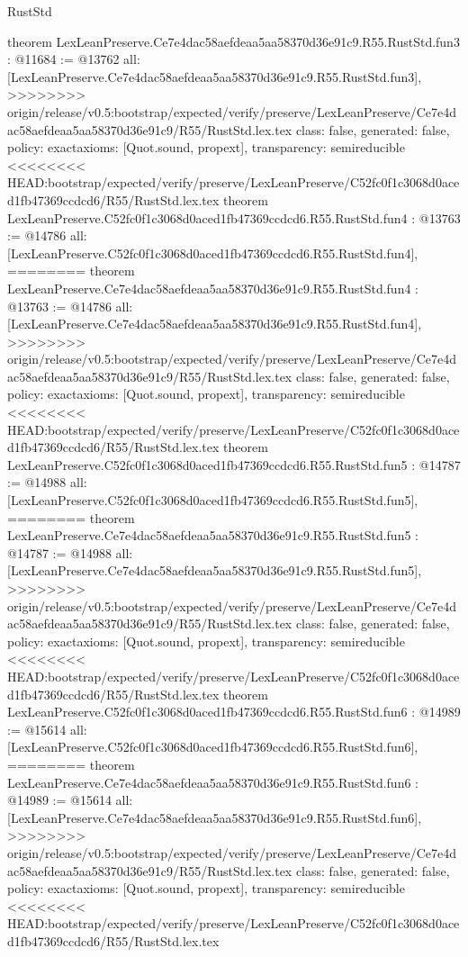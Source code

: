 \begin{lexlean}{RustStd}
\begin{coremodule}
{\begin{coremodule}
{{{{{{theorem LexLeanPreserve.Ce7e4dac58aefdeaa5aa58370d36e91c9.R55.RustStd.fun3 : @11684 := @13762 {
  all: [LexLeanPreserve.Ce7e4dac58aefdeaa5aa58370d36e91c9.R55.RustStd.fun3],
>>>>>>>> origin/release/v0.5:bootstrap/expected/verify/preserve/LexLeanPreserve/Ce7e4dac58aefdeaa5aa58370d36e91c9/R55/RustStd.lex.tex
  class: false,
  generated: false,
  policy: exact{axioms: [Quot.sound, propext]},
  transparency: semireducible
}
<<<<<<<< HEAD:bootstrap/expected/verify/preserve/LexLeanPreserve/C52fc0f1c3068d0aced1fb47369ccdcd6/R55/RustStd.lex.tex
theorem LexLeanPreserve.C52fc0f1c3068d0aced1fb47369ccdcd6.R55.RustStd.fun4 : @13763 := @14786 {
  all: [LexLeanPreserve.C52fc0f1c3068d0aced1fb47369ccdcd6.R55.RustStd.fun4],
========
theorem LexLeanPreserve.Ce7e4dac58aefdeaa5aa58370d36e91c9.R55.RustStd.fun4 : @13763 := @14786 {
  all: [LexLeanPreserve.Ce7e4dac58aefdeaa5aa58370d36e91c9.R55.RustStd.fun4],
>>>>>>>> origin/release/v0.5:bootstrap/expected/verify/preserve/LexLeanPreserve/Ce7e4dac58aefdeaa5aa58370d36e91c9/R55/RustStd.lex.tex
  class: false,
  generated: false,
  policy: exact{axioms: [Quot.sound, propext]},
  transparency: semireducible
}
<<<<<<<< HEAD:bootstrap/expected/verify/preserve/LexLeanPreserve/C52fc0f1c3068d0aced1fb47369ccdcd6/R55/RustStd.lex.tex
theorem LexLeanPreserve.C52fc0f1c3068d0aced1fb47369ccdcd6.R55.RustStd.fun5 : @14787 := @14988 {
  all: [LexLeanPreserve.C52fc0f1c3068d0aced1fb47369ccdcd6.R55.RustStd.fun5],
========
theorem LexLeanPreserve.Ce7e4dac58aefdeaa5aa58370d36e91c9.R55.RustStd.fun5 : @14787 := @14988 {
  all: [LexLeanPreserve.Ce7e4dac58aefdeaa5aa58370d36e91c9.R55.RustStd.fun5],
>>>>>>>> origin/release/v0.5:bootstrap/expected/verify/preserve/LexLeanPreserve/Ce7e4dac58aefdeaa5aa58370d36e91c9/R55/RustStd.lex.tex
  class: false,
  generated: false,
  policy: exact{axioms: [Quot.sound, propext]},
  transparency: semireducible
}
<<<<<<<< HEAD:bootstrap/expected/verify/preserve/LexLeanPreserve/C52fc0f1c3068d0aced1fb47369ccdcd6/R55/RustStd.lex.tex
theorem LexLeanPreserve.C52fc0f1c3068d0aced1fb47369ccdcd6.R55.RustStd.fun6 : @14989 := @15614 {
  all: [LexLeanPreserve.C52fc0f1c3068d0aced1fb47369ccdcd6.R55.RustStd.fun6],
========
theorem LexLeanPreserve.Ce7e4dac58aefdeaa5aa58370d36e91c9.R55.RustStd.fun6 : @14989 := @15614 {
  all: [LexLeanPreserve.Ce7e4dac58aefdeaa5aa58370d36e91c9.R55.RustStd.fun6],
>>>>>>>> origin/release/v0.5:bootstrap/expected/verify/preserve/LexLeanPreserve/Ce7e4dac58aefdeaa5aa58370d36e91c9/R55/RustStd.lex.tex
  class: false,
  generated: false,
  policy: exact{axioms: [Quot.sound, propext]},
  transparency: semireducible
}
<<<<<<<< HEAD:bootstrap/expected/verify/preserve/LexLeanPreserve/C52fc0f1c3068d0aced1fb47369ccdcd6/R55/RustStd.lex.tex
}}}}}}}}}
\end{coremodule}}
\end{coremodule}
\end{lexlean}
